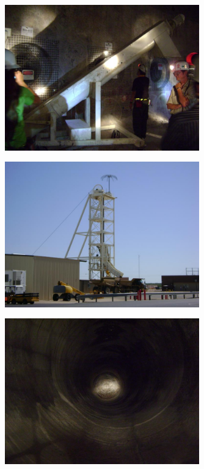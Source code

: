 \documentclass[aspectratio=1610,pdftex,dvipsnames,compress,xcolor={dvipsnames}]{beamer}
\begin{document}
\begin{frame}{}
    \begin{figure}
        \centering
        \includegraphics[width=0.75\textwidth]{wipp4.jpg}
    \end{figure}
\end{frame}


\begin{frame}{}
    \begin{figure}
        \centering
        \includegraphics[width=0.75\textwidth]{wipp5.jpg}
    \end{figure}
\end{frame}


\begin{frame}{}
    \begin{figure}
        \centering
        \includegraphics[width=0.75\textwidth]{wipp6.jpg}
    \end{figure}
\end{frame}
\end{document}

